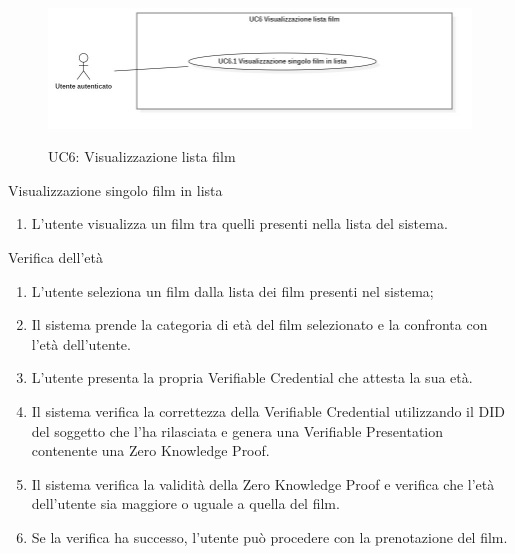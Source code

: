 \begin{figure}[!ht] 
  \centering 
  \includegraphics[width=0.9\columnwidth, alt={Caso d'uso relativo alla visualizzazione della lista dei film dell'utente}]{immagini/usecase/UC6.jpg}
  \caption{UC6: Visualizzazione lista film}\label{fig:uc:visualizzazione-lista-film}
\end{figure}

\begin{usecase}{6.1}{Visualizzazione singolo film in lista}\label{uc:visualizzazione-singolo-lista-film}
  \usecasemain{}
  
  \begin{enumerate}
    \item L'utente visualizza un film tra quelli presenti nella lista del sistema.
  \end{enumerate}
\end{usecase}

\begin{usecase}{7}{Verifica dell'età}\label{uc:verifica-eta}
  \usecasemain{}
  
  \begin{enumerate}
    \item L'utente seleziona un film dalla lista dei film presenti nel sistema;
    \item Il sistema prende la categoria di età del film selezionato e la confronta con l'età dell'utente.
    \item L'utente presenta la propria Verifiable Credential che attesta la sua età.
    \item Il sistema verifica la correttezza della Verifiable Credential utilizzando il DID del soggetto che l'ha rilasciata e genera una Verifiable Presentation contenente una Zero Knowledge Proof.
    \item Il sistema verifica la validità della Zero Knowledge Proof e verifica che l'età dell'utente sia maggiore o uguale a quella del film.
    \item Se la verifica ha successo, l'utente può procedere con la prenotazione del film.
  \end{enumerate}
\end{usecase}

